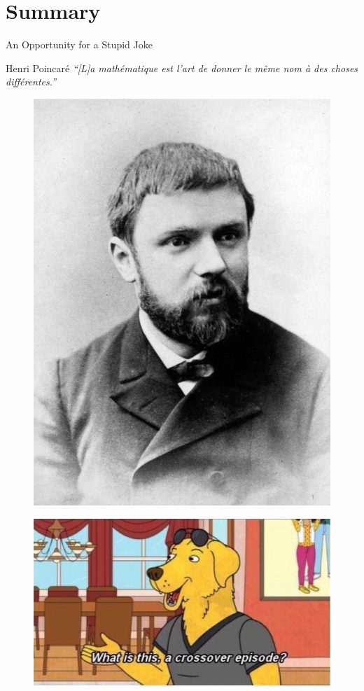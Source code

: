 \section{Summary}

\begin{frame}{An Opportunity for a Stupid Joke}
    \begin{block}{Henri Poincaré}
        \emph{``[L]a mathématique est l'art de donner le même nom à des choses différentes.'' \cite{HP1908}}
    \end{block}

\begin{figure}
\centering
\begin{minipage}{.5\textwidth}
  \centering
  \includegraphics[width=.5\linewidth]{resources/poincare.jpg}
  \label{fig:test1}
\end{minipage}%
\begin{minipage}{.5\textwidth}
  \centering
  \includegraphics[height=.6\linewidth]{resources/meme.jpg}
  \label{fig:test2}
\end{minipage}
\end{figure}

\end{frame}

